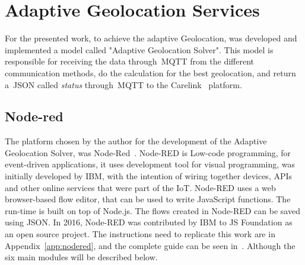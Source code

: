 \newpage

\section{Adaptive Geolocation Services} %
\label{sec:Adaptive Geolocation}
For the presented work, to achieve the adaptive Geolocation, was developed and implemented a model called "Adaptive Geolocation Solver". This model is responsible for receiving the data through~\gls{MQTT} from the different communication methods, do the calculation for the best geolocation, and return a~\gls{JSON} called \emph{status} through~\gls{MQTT} to the Carelink~\cite{carelink} platform.
\subsection{Node-red} %
\label{sec:nodered_sota}
The platform chosen by the author for the development of the Adaptive Geolocation Solver, was Node-Red~\cite{Node}.
Node-RED is  Low-code programming, for event-driven applications, it uses development tool for visual programming, was initially developed by IBM, with the intention of wiring together devices, APIs and other online services that were part of the IoT.
Node-RED uses a web browser-based flow editor, that can be used to write JavaScript functions. The run-time is built on top of Node.js. The flows created in Node-RED can be saved using JSON. In 2016, Node-RED was contributed by IBM  to JS Foundation  as an open source project.
The instructions need to replicate this work are in  Appendix~\ref{app:nodered}, and the complete guide can be seen in~\cite{githubnodered}. Although the six main modules will be described below.

